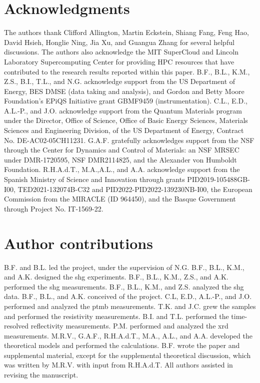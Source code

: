 \section{Acknowledgments}

The authors thank Clifford Allington, Martin Eckstein, Shiang Fang, Feng Hao, David Hsieh, Honglie Ning, Jia Xu, and Guangua Zhang for several helpful discussions.
The authors also acknowledge the MIT SuperCloud and Lincoln Laboratory Supercomputing Center for providing HPC resources that have contributed to the research results reported within this paper.
B.F., B.L., K.M., Z.S., B.I., T.L., and N.G. acknowledge support from the US Department of Energy, BES DMSE (data taking and analysis), and Gordon and Betty Moore Foundation’s EPiQS Initiative grant GBMF9459 (instrumentation).
C.L., E.D., A.L.-P., and J.O. acknowledge support from the Quantum Materials program under the Director, Office of Science, Office of Basic Energy Sciences, Materials Sciences and Engineering Division, of the US Department of Energy, Contract No. DE-AC02-05CH11231.
G.A.F. gratefully acknowledges support from the NSF through the Center for Dynamics and Control of Materials: an NSF MRSEC under DMR-1720595, NSF DMR2114825, and the Alexander von Humboldt Foundation.
R.H.A.d.T., M.A.,A.L., and A.A. acknowledge support from the Spanish Ministry of Science and Innovation through grants PID2019-105488GB-I00, TED2021-132074B-C32 and PID2022-PID2022-139230NB-I00, the European Commission from the MIRACLE (ID 964450), and the Basque Government through Project No. IT-1569-22.

\section{Author contributions}\label{cmb-sec:authorcontributions}
B.F. and B.L. led the project, under the supervision of N.G.
B.F., B.L., K.M., and A.K. designed the \gls{shg} experiments.
B.F., B.L., K.M., Z.S., and A.K. performed the \gls{shg} measurements.
B.F., B.L., K.M., and Z.S. analyzed the \gls{shg} data.
B.F., B.L., and A.K. conceived of the project.
C.L, E.D., A.L.-P., and J.O. performed and analyzed the \gls{ptmb} measurements.
T.K. and J.C. grew the samples and performed the resistivity measurements.
B.I. and T.L. performed the time-resolved reflectivity measurements.
P.M. performed and analyzed the \gls{xrd} measurements.
M.R.V., G.A.F., R.H.A.d.T., M.A., A.L., and A.A. developed the theoretical models and performed the calculations.
B.F. wrote the paper and supplemental material, except for the supplemental theoretical discussion, which was written by M.R.V. with input from R.H.A.d.T.
All authors assisted in revising the manuscript.


